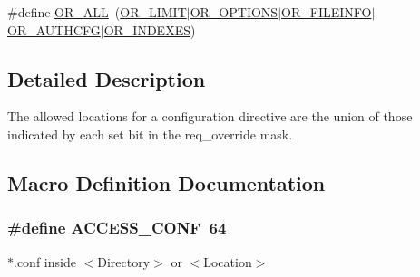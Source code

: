\begin{DoxyCompactItemize}
\item 
\#define \hyperlink{group__ConfigDirectives_ga1cf7da2bf7d8b3caaea4cb6a9abf02b5}{O\+R\+\_\+\+A\+LL}~(\hyperlink{group__ConfigDirectives_ga0dd271e08b921855a2ad2c9dcc1da3ca}{O\+R\+\_\+\+L\+I\+M\+IT}$\vert$\hyperlink{group__ConfigDirectives_ga498a222873d29356a1ab9bd3f936b270}{O\+R\+\_\+\+O\+P\+T\+I\+O\+NS}$\vert$\hyperlink{group__ConfigDirectives_ga3f1f59e707b2f247220fe64d06cb557d}{O\+R\+\_\+\+F\+I\+L\+E\+I\+N\+FO}$\vert$\hyperlink{group__ConfigDirectives_gad707d4eac4b22c5bc225b784ecb6c90e}{O\+R\+\_\+\+A\+U\+T\+H\+C\+FG}$\vert$\hyperlink{group__ConfigDirectives_ga1470585899bbca9fd583e49f17336e1b}{O\+R\+\_\+\+I\+N\+D\+E\+X\+ES})
\end{DoxyCompactItemize}


\subsection{Detailed Description}
The allowed locations for a configuration directive are the union of those indicated by each set bit in the req\+\_\+override mask. 

\subsection{Macro Definition Documentation}
\subsubsection[{\texorpdfstring{A\+C\+C\+E\+S\+S\+\_\+\+C\+O\+NF}{ACCESS_CONF}}]{\setlength{\rightskip}{0pt plus 5cm}\#define A\+C\+C\+E\+S\+S\+\_\+\+C\+O\+NF~64}\hypertarget{group__ConfigDirectives_ga09a3c6983aa6dc02f1d1f49aea0ff4ee}{}\label{group__ConfigDirectives_ga09a3c6983aa6dc02f1d1f49aea0ff4ee}
$\ast$.conf inside $<$Directory$>$ or $<$Location$>$ 
